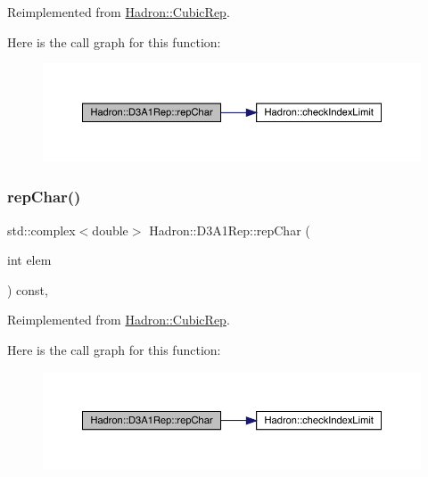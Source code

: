 Reimplemented from \mbox{\hyperlink{structHadron_1_1CubicRep_af45227106e8e715e84b0af69cd3b36f8}{Hadron\+::\+Cubic\+Rep}}.

Here is the call graph for this function\+:
\nopagebreak
\begin{figure}[H]
\begin{center}
\leavevmode
\includegraphics[width=350pt]{d4/df6/structHadron_1_1D3A1Rep_aa169675bc42e174827e727a1f3571227_cgraph}
\end{center}
\end{figure}
\mbox{\label{structHadron_1_1D3A1Rep_aa169675bc42e174827e727a1f3571227}} 
\subsubsection{\texorpdfstring{repChar()}{repChar()}\hspace{0.1cm}{\footnotesize\ttfamily [3/3]}}
{\footnotesize\ttfamily std\+::complex$<$double$>$ Hadron\+::\+D3\+A1\+Rep\+::rep\+Char (\begin{DoxyParamCaption}\item[{int}]{elem }\end{DoxyParamCaption}) const\hspace{0.3cm}{\ttfamily [inline]}, {\ttfamily [virtual]}}



Reimplemented from \mbox{\hyperlink{structHadron_1_1CubicRep_af45227106e8e715e84b0af69cd3b36f8}{Hadron\+::\+Cubic\+Rep}}.

Here is the call graph for this function\+:
\nopagebreak
\begin{figure}[H]
\begin{center}
\leavevmode
\includegraphics[width=350pt]{d4/df6/structHadron_1_1D3A1Rep_aa169675bc42e174827e727a1f3571227_cgraph}
\end{center}
\end{figure}
\mbox{\label{structHadron_1_1D3A1Rep_a618d921105d92d30f7b3c838af644a74}} 
